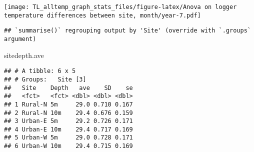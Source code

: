 \documentclass[
]{article}
\newenvironment{Shaded}{\begin{snugshade}}{\end{snugshade}}
\newcommand{\DataTypeTok}[1]{\textcolor[rgb]{0.13,0.29,0.53}{#1}}
\newcommand{\KeywordTok}[1]{\textcolor[rgb]{0.13,0.29,0.53}{\textbf{#1}}}
\newcommand{\NormalTok}[1]{#1}
\newcommand{\OperatorTok}[1]{\textcolor[rgb]{0.81,0.36,0.00}{\textbf{#1}}}
\newcommand{\StringTok}[1]{\textcolor[rgb]{0.31,0.60,0.02}{#1}}
\begin{document}
\texttt{[image: TL\_alltemp\_graph\_stats\_files/figure-latex/Anova on logger temperature differences between site, month/year-7.pdf]}

\begin{Shaded}
\end{Shaded}

\begin{verbatim}
## `summarise()` regrouping output by 'Site' (override with `.groups` argument)
\end{verbatim}

\begin{Shaded}
\begin{Highlighting}[]
\NormalTok{sitedepth.ave}
\end{Highlighting}
\end{Shaded}

\begin{verbatim}
## # A tibble: 6 x 5
## # Groups:   Site [3]
##   Site    Depth   ave    SD    se
##   <fct>   <fct> <dbl> <dbl> <dbl>
## 1 Rural-N 5m     29.0 0.710 0.167
## 2 Rural-N 10m    29.4 0.676 0.159
## 3 Urban-E 5m     29.2 0.726 0.171
## 4 Urban-E 10m    29.4 0.717 0.169
## 5 Urban-W 5m     29.0 0.728 0.171
## 6 Urban-W 10m    29.4 0.715 0.169
\end{verbatim}

\begin{Shaded}
\end{Shaded}
\end{document}
